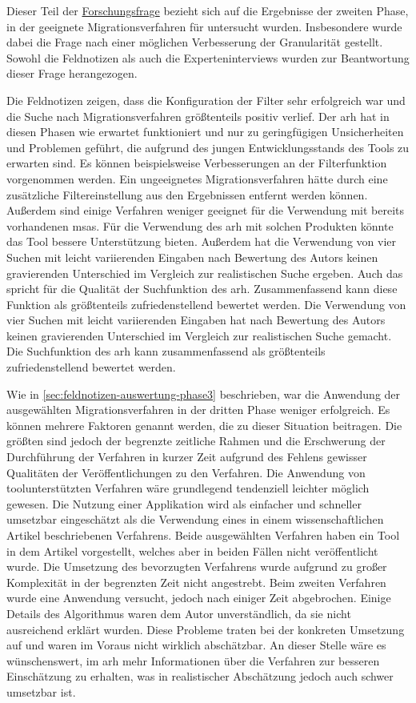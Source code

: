 Dieser Teil der \hyperref[forschungsfrage:1]{Forschungsfrage} bezieht sich auf die Ergebnisse der zweiten Phase, in der geeignete Migrationsverfahren für \jf untersucht wurden.
Insbesondere wurde dabei die Frage nach einer möglichen Verbesserung der Granularität gestellt.
Sowohl die Feldnotizen als auch die Experteninterviews wurden zur Beantwortung dieser Frage herangezogen.

Die Feldnotizen zeigen, dass die Konfiguration der Filter sehr erfolgreich war und die Suche nach Migrationsverfahren größtenteils positiv verlief.
Der \gls{arh} hat in diesen Phasen wie er\-war\-tet funktioniert und nur zu geringfügigen Unsicherheiten und Problemen geführt, die aufgrund des jungen Entwicklungsstands des Tools zu erwarten sind.
Es können beispielsweise Verbesserungen an der Filterfunktion vorgenommen werden.
Ein ungeeignetes Migrationsverfahren hätte durch eine zusätzliche Filtereinstellung aus den Ergebnissen entfernt werden können.
Außerdem sind einige Verfahren weniger geeignet für die Verwendung mit bereits vorhandenen \glspl{msa}.
Für die Verwendung des \gls{arh} mit solchen Produkten könnte das Tool bessere Unterstützung bieten.
Außerdem hat die Verwendung von vier Suchen mit leicht variierenden Eingaben nach Bewertung des Autors keinen gravierenden Unterschied im Vergleich zur realistischen Suche ergeben.
Auch das spricht für die Qualität der Suchfunktion des \gls{arh}.
Zusammenfassend kann diese Funktion als größtenteils zufriedenstellend bewertet werden.
Die Verwendung von vier Suchen mit leicht variierenden Eingaben hat nach Bewertung des Autors keinen gravierenden Unterschied im Vergleich zur realistischen Suche gemacht.
Die Suchfunktion des \gls{arh} kann zusammenfassend als größtenteils zufriedenstellend bewertet werden.

Wie in \cref{sec:feldnotizen-auswertung-phase3} beschrieben, war die Anwendung der ausgewählten Migrationsverfahren in der dritten Phase weniger erfolgreich.
Es können mehrere Faktoren genannt werden, die zu dieser Situation beitragen.
Die größten sind jedoch der begrenzte zeitliche Rahmen und die Erschwerung der Durchführung der Verfahren in kurzer Zeit aufgrund des Fehlens gewisser Qualitäten der Veröffentlichungen zu den Verfahren.
Die Anwendung von toolunterstützten Verfahren wäre grundlegend tendenziell leichter möglich gewesen.
Die Nutzung einer Applikation wird als einfacher und schneller umsetzbar eingeschätzt als die Verwendung eines in einem wissenschaftlichen Artikel beschriebenen Verfahrens.
Beide ausgewählten Verfahren haben ein Tool in dem Artikel vorgestellt, welches aber in beiden Fällen nicht veröffentlicht wurde.
Die Umsetzung des bevorzugten Verfahrens wurde aufgrund zu großer Komplexität in der begrenzten Zeit nicht angestrebt.
Beim zweiten Verfahren wurde eine Anwendung versucht, jedoch nach einiger Zeit abgebrochen.
Einige Details des Algorithmus waren dem Autor unverständlich, da sie nicht ausreichend erklärt wurden.
Diese Probleme traten bei der konkreten Umsetzung auf und waren im Voraus nicht wirklich abschätzbar.
An dieser Stelle wäre es wünschenswert, im \gls{arh} mehr Informationen über die Verfahren zur besseren Einschätzung zu erhalten, was in realistischer Abschätzung jedoch auch schwer umsetzbar ist.

